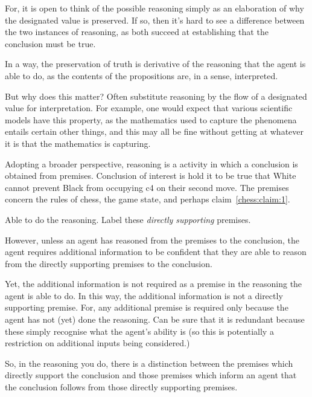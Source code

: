 \documentclass[10pt]{article}
\begin{document}
{
  \begin{note}[Important]
    For, it is open to think of the possible reasoning simply as an elaboration of why the designated value is preserved.
    If so, then it's hard to see a difference between the two instances of reasoning, as both succeed at establishing that the conclusion must be true.

    In a way, the preservation of truth is derivative of the reasoning that the agent is able to do, as the contents of the propositions are, in a sense, interpreted.
  \end{note}

  But why does this matter?
  Often substitute reasoning by the flow of a designated value for interpretation.
  For example, one would expect that various scientific models have this property, as the mathematics used to capture the phenomena entails certain other things, and this may all be fine without getting at whatever it is that the mathematics is capturing.
}

Adopting a broader perspective, reasoning is a activity in which a conclusion is obtained from premises.
Conclusion of interest is hold it to be true that White cannot prevent Black from occupying c4 on their second move.
The premises concern the rules of chess, the game state, and perhaps claim~\ref{chess:claim:1}.

Able to do the reasoning.
Label these \emph{directly supporting} premises.

However, unless an agent has reasoned from the premises to the conclusion, the agent requires additional information to be confident that they are able to reason from the directly supporting premises to the conclusion.

Yet, the additional information is not required as a premise in the reasoning the agent is able to do.
In this way, the additional information is not a directly supporting premise.
For, any additional premise is required only because the agent has not (yet) done the reasoning.
Can be sure that it is redundant because these simply recognise what the agent's ability is (so this is potentially a restriction on additional inputs being considered.)

So, in the reasoning you do, there is a distinction between the premises which directly support the conclusion and those premises which inform an agent that the conclusion follows from those directly supporting premises.
\end{document}

